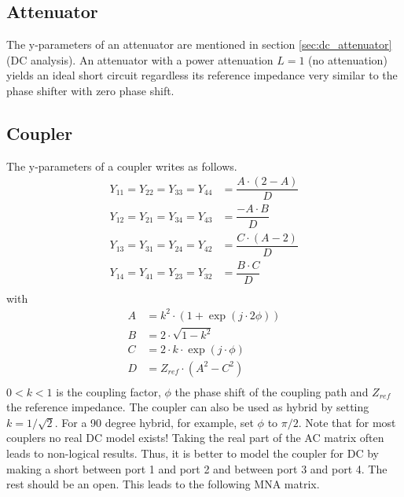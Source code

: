 \subsection{Attenuator}

The y-parameters of an attenuator are mentioned in section
\ref{sec:dc_attenuator} (DC analysis).  An attenuator with a power attenuation
$L=1$ (no attenuation) yields an ideal short circuit regardless its
reference impedance very similar to the phase shifter with zero phase
shift.

\subsection{Coupler}

The y-parameters of a coupler writes as follows.
\begin{align}
Y_{11} = Y_{22} = Y_{33} = Y_{44} &= \dfrac{A\cdot (2-A)}{D} \\
Y_{12} = Y_{21} = Y_{34} = Y_{43} &= \dfrac{-A\cdot B}{D} \\
Y_{13} = Y_{31} = Y_{24} = Y_{42} &= \dfrac{C\cdot (A-2)}{D} \\
Y_{14} = Y_{41} = Y_{23} = Y_{32} &= \dfrac{B\cdot C}{D} \\
\end{align}
with
\begin{align}
A &= k^2 \cdot \left( 1+\exp(j\cdot 2\phi) \right) \\
B &= 2 \cdot \sqrt{1-k^2} \\
C &= 2 \cdot k \cdot \exp(j\cdot\phi) \\
D &= Z_{ref}\cdot (A^2 - C^2) \\
\end{align}
$0<k<1$ is the coupling factor, $\phi$ the phase shift of the
coupling path and $Z_{ref}$ the reference impedance.
The coupler can also be used as hybrid by setting $k=1/\sqrt{2}$.
For a 90 degree hybrid, for example, set $\phi$ to $\pi / 2$.
Note that for most couplers no real DC model exists! Taking
the real part of the AC matrix often leads to non-logical
results. Thus, it is better to model the coupler for DC by
making a short between port 1 and port 2 and between port 3
and port 4. The rest should be an open. This leads to the
following MNA matrix.
